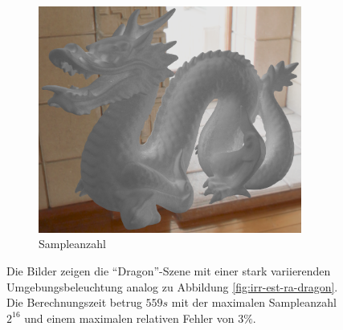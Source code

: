 \begin{figure}[h]
\begin{subfigure}[t]{0.33\textwidth}
				\center
				\includegraphics[width=0.95\textwidth]{pic/irr_est-ra-dragon2-scount.png}
				\caption{Sampleanzahl}
			\end{subfigure}
			\caption[Zweite adaptive Vertex-Irradiance-Map anhand der \enquote{Dragon}-Szene]{Die Bilder zeigen die \enquote{Dragon}-Szene mit einer stark variierenden Umgebungsbeleuchtung analog zu Abbildung \ref{fig:irr-est-ra-dragon}. Die Berechnungszeit betrug $559\unit{s}$ mit der maximalen Sampleanzahl $2^{16}$ und einem maximalen relativen Fehler von $3\unit{\%}$.}
			\label{fig:irr-est-ra-dragon2}
		\end{figure}

